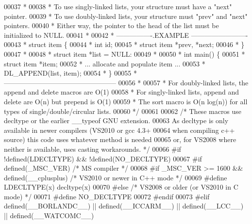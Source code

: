 \begin{DoxyCode}
00037 \textcolor{comment}{ *}
00038 \textcolor{comment}{ * To use singly-linked lists, your structure must have a "next" pointer.}
00039 \textcolor{comment}{ * To use doubly-linked lists, your structure must "prev" and "next" pointers.}
00040 \textcolor{comment}{ * Either way, the pointer to the head of the list must be initialized to NULL.}
00041 \textcolor{comment}{ *}
00042 \textcolor{comment}{ * ----------------.EXAMPLE -------------------------}
00043 \textcolor{comment}{ * struct item \{}
00044 \textcolor{comment}{ *      int id;}
00045 \textcolor{comment}{ *      struct item *prev, *next;}
00046 \textcolor{comment}{ * \}}
00047 \textcolor{comment}{ *}
00048 \textcolor{comment}{ * struct item *list = NULL:}
00049 \textcolor{comment}{ *}
00050 \textcolor{comment}{ * int main() \{}
00051 \textcolor{comment}{ *      struct item *item;}
00052 \textcolor{comment}{ *      ... allocate and populate item ...}
00053 \textcolor{comment}{ *      DL\_APPEND(list, item);}
00054 \textcolor{comment}{ * \}}
00055 \textcolor{comment}{ * --------------------------------------------------}
00056 \textcolor{comment}{ *}
00057 \textcolor{comment}{ * For doubly-linked lists, the append and delete macros are O(1)}
00058 \textcolor{comment}{ * For singly-linked lists, append and delete are O(n) but prepend is O(1)}
00059 \textcolor{comment}{ * The sort macro is O(n log(n)) for all types of single/double/circular lists.}
00060 \textcolor{comment}{ */}
00061 
00062 \textcolor{comment}{/* These macros use decltype or the earlier \_\_typeof GNU extension.}
00063 \textcolor{comment}{   As decltype is only available in newer compilers (VS2010 or gcc 4.3+}
00064 \textcolor{comment}{   when compiling c++ source) this code uses whatever method is needed}
00065 \textcolor{comment}{   or, for VS2008 where neither is available, uses casting workarounds. */}
00066 \textcolor{preprocessor}{#if !defined(LDECLTYPE) && !defined(NO\_DECLTYPE)}
00067 \textcolor{preprocessor}{#if defined(\_MSC\_VER)   }\textcolor{comment}{/* MS compiler */}\textcolor{preprocessor}{}
00068 \textcolor{preprocessor}{#if \_MSC\_VER >= 1600 && defined(\_\_cplusplus)  }\textcolor{comment}{/* VS2010 or newer in C++ mode */}\textcolor{preprocessor}{}
00069 \textcolor{preprocessor}{#define LDECLTYPE(x) decltype(x)}
00070 \textcolor{preprocessor}{#else                   }\textcolor{comment}{/* VS2008 or older (or VS2010 in C mode) */}\textcolor{preprocessor}{}
00071 \textcolor{preprocessor}{#define NO\_DECLTYPE}
00072 \textcolor{preprocessor}{#endif}
00073 \textcolor{preprocessor}{#elif defined(\_\_BORLANDC\_\_) || defined(\_\_ICCARM\_\_) || defined(\_\_LCC\_\_) || defined(\_\_WATCOMC\_\_)}

\end{DoxyCode}
